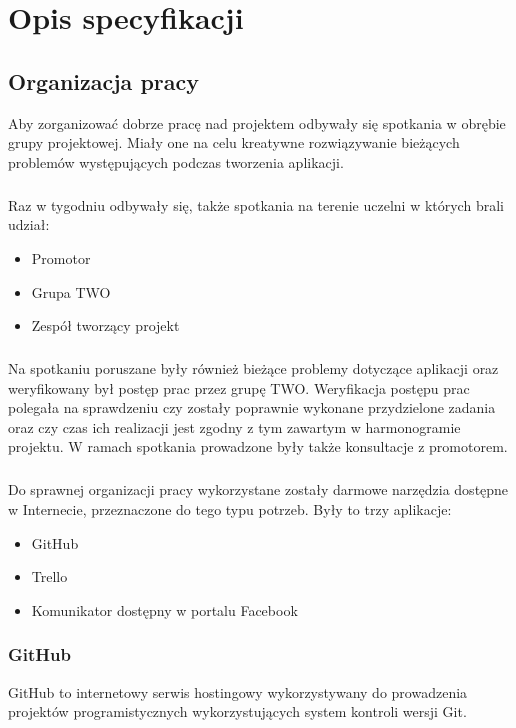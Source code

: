 \chapter{Opis specyfikacji}

\section{Organizacja pracy}

Aby zorganizować dobrze pracę nad projektem odbywały się spotkania w obrębie grupy projektowej. Miały one na celu kreatywne rozwiązywanie bieżących problemów występujących podczas tworzenia aplikacji. 
\paragraph{}
Raz w tygodniu odbywały się, także spotkania na terenie uczelni w których brali udział:
\begin{itemize}
\item Promotor
\item Grupa TWO
\item Zespół tworzący projekt
\end{itemize}

\paragraph{}
Na spotkaniu poruszane były również bieżące problemy dotyczące aplikacji oraz weryfikowany był postęp prac przez grupę TWO. Weryfikacja postępu prac polegała na sprawdzeniu czy zostały poprawnie wykonane przydzielone zadania oraz czy czas ich realizacji jest zgodny z tym zawartym w harmonogramie projektu. W ramach spotkania prowadzone były także konsultacje z promotorem.
\paragraph{}
Do sprawnej organizacji pracy wykorzystane zostały darmowe narzędzia dostępne w Internecie, przeznaczone do tego typu potrzeb. Były to trzy aplikacje:
\begin{itemize}
\item GitHub
\item Trello
\item Komunikator dostępny w portalu Facebook
\end{itemize}

\subsection{GitHub}
GitHub to internetowy serwis hostingowy wykorzystywany do prowadzenia projektów programistycznych wykorzystujących system kontroli wersji Git. 
